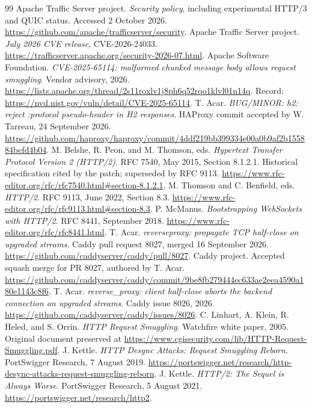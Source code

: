 \documentclass[11pt,letterpaper]{article}
\begin{document}
\begin{thebibliography}{99}
 Apache Traffic Server project. \emph{Security policy}, including experimental HTTP/3 and QUIC status. Accessed 2 October 2026. \url{https://github.com/apache/trafficserver/security}.
 Apache Traffic Server project. \emph{July 2026 CVE release}, CVE-2026-24033. \url{https://trafficserver.apache.org/security-2026-07.html}.
 Apache Software Foundation. \emph{CVE-2025-65114: malformed chunked message body allows request smuggling}. Vendor advisory, 2026. \url{https://lists.apache.org/thread/2s11roxlv1j8ph6q52rqo1klvl01n14q}. Record: \url{https://nvd.nist.gov/vuln/detail/CVE-2025-65114}.
 T. Acar. \emph{BUG/MINOR: h2: reject :protocol pseudo-header in H2 responses}. HAProxy commit accepted by W. Tarreau, 24 September 2026. \url{https://github.com/haproxy/haproxy/commit/4ddf219bb399334e00a0b9af2b155884befd4b04}.
 M. Belshe, R. Peon, and M. Thomson, eds. \emph{Hypertext Transfer Protocol Version 2 (HTTP/2)}. RFC 7540, May 2015, Section 8.1.2.1. Historical specification cited by the patch; superseded by RFC 9113. \url{https://www.rfc-editor.org/rfc/rfc7540.html#section-8.1.2.1}.
 M. Thomson and C. Benfield, eds. \emph{HTTP/2}. RFC 9113, June 2022, Section 8.3. \url{https://www.rfc-editor.org/rfc/rfc9113.html#section-8.3}.
 P. McManus. \emph{Bootstrapping WebSockets with HTTP/2}. RFC 8441, September 2018. \url{https://www.rfc-editor.org/rfc/rfc8441.html}.
 T. Acar. \emph{reverseproxy: propagate TCP half-close on upgraded streams}. Caddy pull request 8027, merged 16 September 2026. \url{https://github.com/caddyserver/caddy/pull/8027}.
 Caddy project. Accepted squash merge for PR 8027, authored by T. Acar. \url{https://github.com/caddyserver/caddy/commit/9be8fb279444ec633ae2eea4590a180e1143c8f6}.
 T. Acar. \emph{reverse\_proxy: client half-close aborts the backend connection on upgraded streams}. Caddy issue 8026, 2026. \url{https://github.com/caddyserver/caddy/issues/8026}.
 C. Linhart, A. Klein, R. Heled, and S. Orrin. \emph{HTTP Request Smuggling}. Watchfire white paper, 2005. Original document preserved at \url{https://www.cgisecurity.com/lib/HTTP-Request-Smuggling.pdf}.
 J. Kettle. \emph{HTTP Desync Attacks: Request Smuggling Reborn}. PortSwigger Research, 7 August 2019. \url{https://portswigger.net/research/http-desync-attacks-request-smuggling-reborn}.
 J. Kettle. \emph{HTTP/2: The Sequel is Always Worse}. PortSwigger Research, 5 August 2021. \url{https://portswigger.net/research/http2}.

\end{thebibliography}
\end{document}
